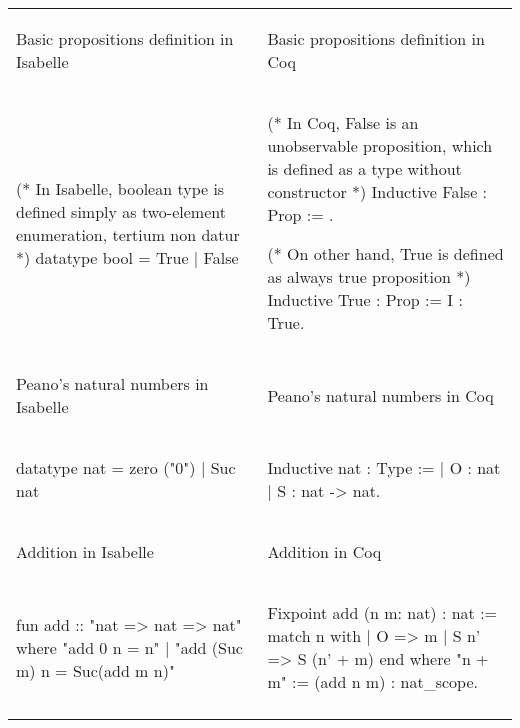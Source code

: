 \documentclass[article]{aaltoseries}
\begin{document}
\bgroup
\def\arraystretch{0}%
\begin{tabular}{p{.45\linewidth} p{.45\linewidth}}
\begin{center}Basic propositions definition in Isabelle\end{center}  &  \begin{center}Basic propositions definition in Coq\end{center} \\
\begin{isabelle}
    (* In Isabelle, boolean type is defined simply as two-element enumeration, tertium non datur *)
    datatype bool = True | False
\end{isabelle}
&
\begin{coq}
    (* In Coq, False is an unobservable proposition, which is defined as a type without constructor *)
    Inductive False : Prop := .
    
    (* On other hand, True is defined as always true proposition *)
    Inductive True : Prop := I : True.
\end{coq}
\\ \arrayrulecolor{gray}\hline

\begin{center}Peano's natural numbers in Isabelle\end{center}  &  \begin{center}Peano's natural numbers in Coq\end{center} \\
\begin{isabelle}
    datatype nat = 
    zero ("0")
    | Suc nat
\end{isabelle}
&
\begin{coq}
    Inductive nat : Type :=
    | O : nat
    | S : nat -> nat.
\end{coq}
\\ \arrayrulecolor{gray}\hline

\begin{center}Addition in Isabelle\end{center}  &  \begin{center}Addition in Coq\end{center} \\
\begin{isabelle}
fun add :: "nat => nat => nat"
  where
    "add 0 n = n"
    | "add (Suc m) n = Suc(add m n)"
\end{isabelle}
&
\begin{coq}
Fixpoint add (n m: nat) : nat :=
  match n with
    | O => m
    | S n' => S (n' + m)
  end
where "n + m" := (add n m) : nat_scope.
\end{coq}
\\ \arrayrulecolor{gray}\hline


\end{tabular}
\end{document}
